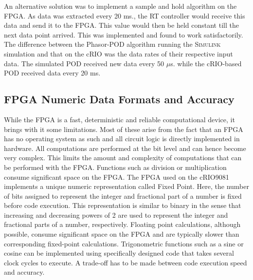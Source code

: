 \documentclass[journal]{IEEEtran}
\begin{document}
An alternative solution was to implement a sample and hold algorithm on the FPGA. As data was extracted every 20 ms., the RT controller would receive this data and send it to the FPGA. This value would then be held constant till the next data point arrived. This was implemented and found to work satisfactorily. The difference between the Phasor-POD algorithm running the \textsc{Simulink} simulation and that on the cRIO was the data rates of their respective input data. The simulated POD received new data every 50 $\mu$s. while the cRIO-based POD received data every 20 ms.

\subsection{FPGA Numeric Data Formats and Accuracy}

While the FPGA is a fast, deterministic and reliable computational device, it brings with it some limitations. Most of these arise from the fact that an FPGA has no operating system as such and all circuit logic is directly implemented in hardware. All computations are performed at the bit level and can hence become very complex. This limits the amount and complexity of computations that can be performed with the FPGA. Functions such as division or multiplication consume significant space on the FPGA\cite{LabVIEWCourse}. The FPGA used on the cRIO9081 implements a unique numeric representation called Fixed Point\cite{LabViewManuals}. Here, the number of bits assigned to represent the integer and fractional part of a number is fixed before code execution\cite{LabVIEWCourse}. This representation is similar to binary in the sense that increasing and decreasing powers of 2 are used to represent the integer and fractional parts of a number, respectively. Floating point calculations, although possible, consume significant space on the FPGA and are typically slower than corresponding fixed-point calculations\cite{LabVIEWCourse}. Trigonometric functions such as a sine or cosine can be implemented using specifically designed code that takes several clock cycles to execute. A trade-off has to be made between code execution speed and accuracy.\\
\end{document}
